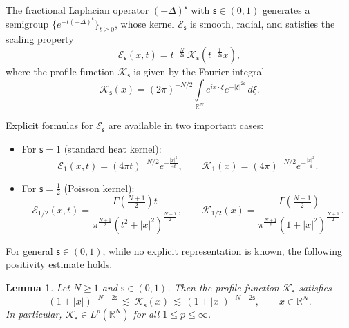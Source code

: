 \documentclass[12pt,reqno]{amsart}
\theoremstyle{plain}
\newtheorem{lem}[thm]{Lemma}
\theoremstyle{definition}
\theoremstyle{remark}
\numberwithin{equation}{section}
\newcommand{\R}{\mathbb R}
\newcommand{\ts}{\mathsf{s}}
\begin{document}
The fractional Laplacian operator $(-\Delta)^{\ts}$ with $\ts\in (0,1)$ generates a semigroup $\{e^{-t(-\Delta)^{\ts}}\}_{t \geq 0}$, whose kernel $\mathscr{E}_{\ts}$ is smooth, radial, and satisfies the scaling property
\begin{equation}\label{kernel}
    \mathscr{E}_{\ts}(x,t) = t^{-\frac{N}{2\ts}} \, \mathscr{K}_{\ts}\!\left(t^{-\frac{1}{2\ts}}x\right),
\end{equation}
where the profile function $\mathscr{K}_{\ts}$ is given by the Fourier integral
\begin{equation}\label{K-s}
    \mathscr{K}_{\ts}(x) = (2\pi)^{-N/2}\int\limits_{\R^N} e^{i x\cdot\xi} e^{-|\xi|^{2\ts}} \, d\xi.
\end{equation}

Explicit formulas for $\mathscr{E}_{\ts}$ are available in two important cases:
\begin{itemize}
    \item For $\ts=1$ (standard heat kernel):
    \begin{equation}\label{Gauss}
        \mathscr{E}_{1}(x,t) = (4\pi t)^{-N/2} e^{-\tfrac{|x|^2}{4t}}, 
        \qquad \mathscr{K}_{1}(x) = (4\pi)^{-N/2} e^{-\tfrac{|x|^2}{4}}.
    \end{equation}
    \item For $\ts=\tfrac{1}{2}$ (Poisson kernel):
    \begin{equation}\label{Poisson}
        \mathscr{E}_{1/2}(x,t) = 
        \frac{\Gamma\!\left(\tfrac{N+1}{2}\right) t}{\pi^{\frac{N+1}{2}} (t^2 + |x|^2)^{\frac{N+1}{2}}},
        \qquad 
        \mathscr{K}_{1/2}(x) = 
        \frac{\Gamma\!\left(\tfrac{N+1}{2}\right)}{\pi^{\frac{N+1}{2}} (1 + |x|^2)^{\frac{N+1}{2}}}.
    \end{equation}
\end{itemize}

For general $\ts \in (0,1)$, while no explicit representation is known, the following positivity estimate holds.

\begin{lem}\label{Positive}
Let $N \geq 1$ and $\ts \in (0,1)$. Then the profile function $\mathscr{K}_{\ts}$ satisfies
\begin{equation}\label{kthetaest}
    (1+|x|)^{-N-2\ts} \,\lesssim\, \mathscr{K}_{\ts}(x) \,\lesssim\, (1+|x|)^{-N-2\ts},
    \qquad x \in \R^N.
\end{equation}
In particular, $\mathscr{K}_{\ts} \in L^p(\R^N)$ for all $1 \leq p \leq \infty$.
\end{lem}
\end{document}
